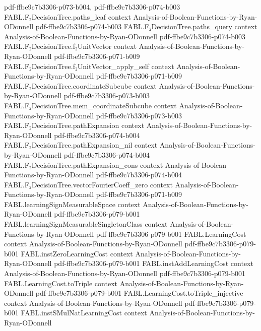 \begin{theorem}
  {pdf-ffbe9c7b3306-p073-b004,
    pdf-ffbe9c7b3306-p074-b003}
\proofstep
  {FABL.F₂DecisionTree.paths_leaf}
  {context}
  {Analysis-of-Boolean-Functions-by-Ryan-ODonnell}
  {pdf-ffbe9c7b3306-p074-b003}
\proofstep
  {FABL.F₂DecisionTree.paths_query}
  {context}
  {Analysis-of-Boolean-Functions-by-Ryan-ODonnell}
  {pdf-ffbe9c7b3306-p074-b003}
\proofstep
  {FABL.F₂DecisionTree.f₂UnitVector}
  {context}
  {Analysis-of-Boolean-Functions-by-Ryan-ODonnell}
  {pdf-ffbe9c7b3306-p071-b009}
\proofstep
  {FABL.F₂DecisionTree.f₂UnitVector_apply_self}
  {context}
  {Analysis-of-Boolean-Functions-by-Ryan-ODonnell}
  {pdf-ffbe9c7b3306-p071-b009}
\proofstep
  {FABL.F₂DecisionTree.coordinateSubcube}
  {context}
  {Analysis-of-Boolean-Functions-by-Ryan-ODonnell}
  {pdf-ffbe9c7b3306-p073-b003}
\proofstep
  {FABL.F₂DecisionTree.mem_coordinateSubcube}
  {context}
  {Analysis-of-Boolean-Functions-by-Ryan-ODonnell}
  {pdf-ffbe9c7b3306-p073-b003}
\proofstep
  {FABL.F₂DecisionTree.pathExpansion}
  {context}
  {Analysis-of-Boolean-Functions-by-Ryan-ODonnell}
  {pdf-ffbe9c7b3306-p074-b004}
\proofstep
  {FABL.F₂DecisionTree.pathExpansion_nil}
  {context}
  {Analysis-of-Boolean-Functions-by-Ryan-ODonnell}
  {pdf-ffbe9c7b3306-p074-b004}
\proofstep
  {FABL.F₂DecisionTree.pathExpansion_cons}
  {context}
  {Analysis-of-Boolean-Functions-by-Ryan-ODonnell}
  {pdf-ffbe9c7b3306-p074-b004}
\proofstep
  {FABL.F₂DecisionTree.vectorFourierCoeff_zero}
  {context}
  {Analysis-of-Boolean-Functions-by-Ryan-ODonnell}
  {pdf-ffbe9c7b3306-p071-b009}
\proofstep
  {FABL.learningSignMeasurableSpace}
  {context}
  {Analysis-of-Boolean-Functions-by-Ryan-ODonnell}
  {pdf-ffbe9c7b3306-p079-b001}
\proofstep
  {FABL.learningSignMeasurableSingletonClass}
  {context}
  {Analysis-of-Boolean-Functions-by-Ryan-ODonnell}
  {pdf-ffbe9c7b3306-p079-b001}
\proofstep
  {FABL.LearningCost}
  {context}
  {Analysis-of-Boolean-Functions-by-Ryan-ODonnell}
  {pdf-ffbe9c7b3306-p079-b001}
\proofstep
  {FABL.instZeroLearningCost}
  {context}
  {Analysis-of-Boolean-Functions-by-Ryan-ODonnell}
  {pdf-ffbe9c7b3306-p079-b001}
\proofstep
  {FABL.instAddLearningCost}
  {context}
  {Analysis-of-Boolean-Functions-by-Ryan-ODonnell}
  {pdf-ffbe9c7b3306-p079-b001}
\proofstep
  {FABL.LearningCost.toTriple}
  {context}
  {Analysis-of-Boolean-Functions-by-Ryan-ODonnell}
  {pdf-ffbe9c7b3306-p079-b001}
\proofstep
  {FABL.LearningCost.toTriple_injective}
  {context}
  {Analysis-of-Boolean-Functions-by-Ryan-ODonnell}
  {pdf-ffbe9c7b3306-p079-b001}
\proofstep
  {FABL.instSMulNatLearningCost}
  {context}
  {Analysis-of-Boolean-Functions-by-Ryan-ODonnell}

\end{theorem}
